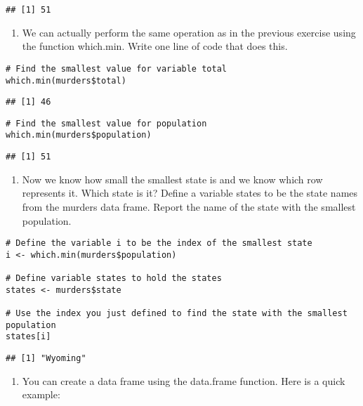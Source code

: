 \documentclass[
]{article}
\providecommand{\tightlist}{%
  \setlength{\itemsep}{0pt}\setlength{\parskip}{0pt}}
\begin{document}
\begin{verbatim}
## [1] 51
\end{verbatim}

\begin{enumerate}
\def\labelenumi{\arabic{enumi}.}
\setcounter{enumi}{2}
\tightlist
\item
  We can actually perform the same operation as in the previous exercise
  using the function which.min. Write one line of code that does this.
\end{enumerate}

\begin{verbatim}
# Find the smallest value for variable total 
which.min(murders$total)
\end{verbatim}

\begin{verbatim}
## [1] 46
\end{verbatim}

\begin{verbatim}
# Find the smallest value for population
which.min(murders$population)
\end{verbatim}

\begin{verbatim}
## [1] 51
\end{verbatim}

\begin{enumerate}
\def\labelenumi{\arabic{enumi}.}
\setcounter{enumi}{3}
\tightlist
\item
  Now we know how small the smallest state is and we know which row
  represents it. Which state is it? Define a variable states to be the
  state names from the murders data frame. Report the name of the state
  with the smallest population.
\end{enumerate}

\begin{verbatim}
# Define the variable i to be the index of the smallest state
i <- which.min(murders$population)

# Define variable states to hold the states
states <- murders$state

# Use the index you just defined to find the state with the smallest population
states[i]
\end{verbatim}

\begin{verbatim}
## [1] "Wyoming"
\end{verbatim}

\begin{enumerate}
\def\labelenumi{\arabic{enumi}.}
\setcounter{enumi}{4}
\tightlist
\item
  You can create a data frame using the data.frame function. Here is a
  quick example:
\end{enumerate}
\end{document}

